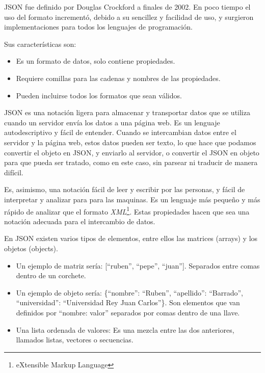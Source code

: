 \documentclass[a4paper, 12pt]{book}
\begin{document}
\vspace{5mm}
JSON fue definido por Douglas Crockford a finales de 2002. En poco tiempo el uso del formato incrementó, debido a su sencillez y facilidad de uso, y surgieron implementaciones para todos los lenguajes de programación. 

\vspace{5mm}
Sus características son:

\begin{itemize}
\item Es un formato de datos, solo contiene propiedades.
\item Requiere comillas para las cadenas y nombres de las propiedades.
\item Pueden incluirse todos los formatos que sean válidos.
\end{itemize}

\vspace{5mm}
JSON es una notación ligera para almacenar y transportar datos que se utiliza cuando un servidor envía los datos a una página web. Es un lenguaje autodescriptivo y fácil de entender. Cuando se intercambian datos entre el servidor y la página web, estos datos pueden ser texto, lo que hace que podamos convertir el objeto en JSON, y enviarlo al servidor, o convertir el JSON en objeto para que pueda ser tratado, como en este caso, sin parsear ni traducir de manera difícil.

Es, asimismo, una notación fácil de leer y escribir por las personas, y fácil de interpretar y analizar para para las maquinas. Es un lenguaje más pequeño y más rápido de analizar que el formato \textit{XML}\footnote{eXtensible Markup Language}. Estas propiedades hacen que sea una notación adecuada para el intercambio de datos. 

\vspace{5mm}
En JSON existen varios tipos de elementos, entre ellos las matrices (arrays) y los objetos (objects). 
\begin{itemize}
\item Un ejemplo de matriz sería: [“ruben”, “pepe”, “juan”]. Separados entre comas dentro de un corchete.
\item Un ejemplo de objeto sería: \{“nombre”: “Ruben”, “apellido”: “Barrado”, “universidad”: “Universidad Rey Juan Carlos”\}. Son elementos que van definidos por “nombre: valor” separados por comas dentro de una llave.
\item Una lista ordenada de valores: Es una mezcla entre las dos anteriores, llamados listas, vectores o secuencias. 
\end{itemize}
\end{document}
